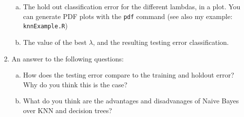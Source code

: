 \begin{exercise}
\begin{enumerate}
\begin{enumerate}[(a)]
    \item The hold out classification error for the different
      lambdas, in a plot. You can generate PDF plots with the \texttt{pdf} command (see also my example: \texttt{knnExample.R})
    \item The value of the best $\lambda$, and the
      resulting testing error classification.
    \end{enumerate}
  \item An answer to the following questions:
    \begin{enumerate}[(a)]
    \item How does the testing error compare to the training and holdout
      error? Why do you think this is the case?
    \item What do you think are the advantages and disadvanages of Naive
      Bayes over KNN and decision trees?
    \end{enumerate}
  \end{enumerate}
\end{exercise}




